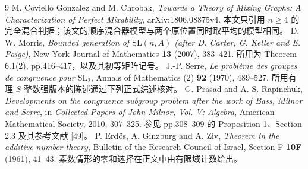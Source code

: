 \begin{thebibliography}{9}
M. Coviello Gonzalez and M. Chrobak,
\emph{Towards a Theory of Mixing Graphs: A Characterization of Perfect Mixability},
arXiv:1806.08875v4.
本文只引用 $n\ge4$ 的完全混合判据；该文的顺序混合器模型与两个原位置同时取平均的模型相同。
D. W. Morris,
\emph{Bounded generation of $\mathrm{SL}(n,A)$ (after D. Carter, G. Keller and E. Paige)},
New York Journal of Mathematics \textbf{13} (2007), 383--421.
所用为 Theorem 6.1(2), pp.416--417，以及其初等矩阵记号。
J.-P. Serre,
\emph{Le probl\`eme des groupes de congruence pour $\mathrm{SL}_2$},
Annals of Mathematics (2) \textbf{92} (1970), 489--527.
所用有理 $S$ 整数强版本的陈述通过下列正式综述核对。
G. Prasad and A. S. Rapinchuk,
\emph{Developments on the congruence subgroup problem after the work of Bass, Milnor and Serre},
in \emph{Collected Papers of John Milnor, Vol. V: Algebra},
American Mathematical Society, 2010, 307--325.
参见 pp.308--309 的 Proposition 1、Section 2.3 及其参考文献 [49]。
P. Erd\H{o}s, A. Ginzburg and A. Ziv,
\emph{Theorem in the additive number theory},
Bulletin of the Research Council of Israel, Section F \textbf{10F} (1961), 41--43.
素数情形的零和选择在正文中由有限域计数给出。
\end{thebibliography}

